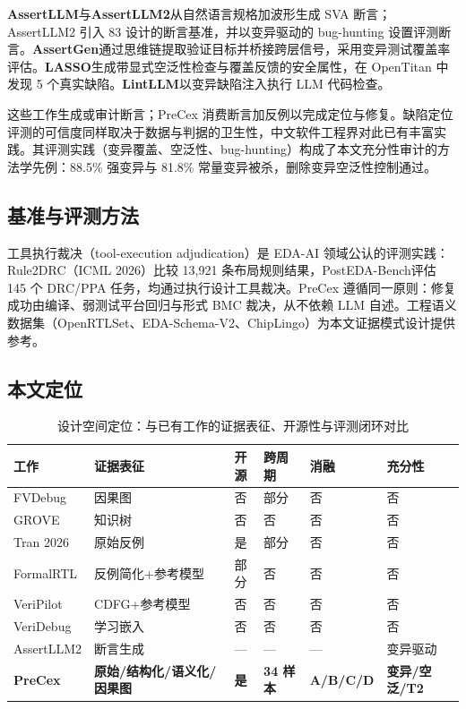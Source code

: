 \documentclass[journal]{IEEEtran}
\begin{document}
\textbf{AssertLLM}\cite{assertllm}与\textbf{AssertLLM2}\cite{assertllm2}从自然语言规格加波形生成 SVA 断言；AssertLLM2 引入 83 设计的断言基准，并以变异驱动的 bug-hunting 设置评测断言。\textbf{AssertGen}\cite{assertgen}通过思维链提取验证目标并桥接跨层信号，采用变异测试覆盖率评估。\textbf{LASSO}\cite{lasso}生成带显式空泛性检查与覆盖反馈的安全属性，在 OpenTitan 中发现 5 个真实缺陷。\textbf{LintLLM}\cite{lintllm}以变异缺陷注入执行 LLM 代码检查。

这些工作生成或审计断言；PreCex 消费断言加反例以完成定位与修复。缺陷定位评测的可信度同样取决于数据与判据的卫生性，中文软件工程界对此已有丰富实践\cite{zh4}。其评测实践（变异覆盖、空泛性、bug-hunting）构成了本文充分性审计的方法学先例：88.5\% 强变异与 81.8\% 常量变异被杀，删除变异空泛性控制通过。

\subsection{基准与评测方法}

工具执行裁决（tool-execution adjudication）是 EDA-AI 领域公认的评测实践：Rule2DRC\cite{rule2drc}（ICML 2026）比较 13,921 条布局规则结果，PostEDA-Bench\cite{posteda}评估 145 个 DRC/PPA 任务，均通过执行设计工具裁决。PreCex 遵循同一原则：修复成功由编译、弱测试平台回归与形式 BMC 裁决，从不依赖 LLM 自述。工程语义数据集（OpenRTLSet\cite{openrtlset}、EDA-Schema-V2\cite{edaschema}、ChipLingo\cite{chiplingo}）为本文证据模式设计提供参考。

\subsection{本文定位}

\begin{table}[!t]
\centering
\caption{设计空间定位：与已有工作的证据表征、开源性与评测闭环对比}
\label{tab:positioning}
\scriptsize
\setlength{\tabcolsep}{2pt}
\renewcommand{\arraystretch}{1.12}
\begin{tabular}{p{}p{}c p{}p{}p{}}
\toprule
\textbf{工作} & \textbf{证据表征} & \textbf{开源} & \textbf{跨周期} & \textbf{消融} & \textbf{充分性} \\
\midrule
FVDebug & 因果图 & 否 & 部分 & 否 & 否 \\
GROVE & 知识树 & 否 & 否 & 否 & 否 \\
Tran 2026 & 原始反例 & 是 & 部分 & 否 & 否 \\
FormalRTL & 反例简化+参考模型 & 部分 & 否 & 否 & 否 \\
VeriPilot & CDFG+参考模型 & 否 & 否 & 否 & 否 \\
VeriDebug & 学习嵌入 & 否 & 否 & 否 & 否 \\
AssertLLM2 & 断言生成 & --- & --- & --- & 变异驱动 \\
\textbf{PreCex} & \textbf{原始/结构化/语义化/因果图} & \textbf{是} & \textbf{34 样本} & \textbf{A/B/C/D} & \textbf{变异/空泛/T2} \\
\bottomrule
\end{tabular}
\end{table}
\end{document}
